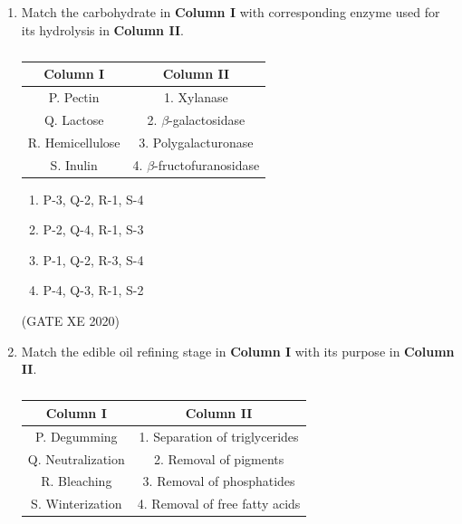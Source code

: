 \documentclass[12pt]{article}
\begin{document}
\begin{enumerate}
\begin{enumerate}
\item P-4, Q-1, R-2, S-3
\item P-4, Q-3, R-1, S-2
\item P-2, Q-3, R-1, S-4
\item P-2, Q-4, R-1, S-3
\end{enumerate}
(GATE XE 2020)

\item Match the carbohydrate in \textbf{Column I} with corresponding enzyme used for its hydrolysis in \textbf{Column II}.
\begin{table}[H]
\centering
\caption{}
\label{}
\begin{tabular}{|c|c|}
\hline
Column I & Column II \\
\hline
P. Pectin & 1. Xylanase \\
Q. Lactose & 2. $\beta$-galactosidase \\
R. Hemicellulose & 3. Polygalacturonase \\
S. Inulin & 4. $\beta$-fructofuranosidase \\
\hline
\end{tabular}
\end{table}

\begin{enumerate}
\item P-3, Q-2, R-1, S-4
\item P-2, Q-4, R-1, S-3
\item P-1, Q-2, R-3, S-4
\item P-4, Q-3, R-1, S-2
\end{enumerate}
(GATE XE 2020)

\item Match the edible oil refining stage in \textbf{Column I} with its purpose in \textbf{Column II}.
\begin{table}[H]
\centering
\caption{}
\label{}
\begin{tabular}{|c|c|}
\hline
Column I & Column II \\
\hline
P. Degumming & 1. Separation of triglycerides \\
Q. Neutralization & 2. Removal of pigments \\
R. Bleaching & 3. Removal of phosphatides \\
S. Winterization & 4. Removal of free fatty acids \\
\hline
\end{tabular}
\end{table}


\end{enumerate}
\end{document}
